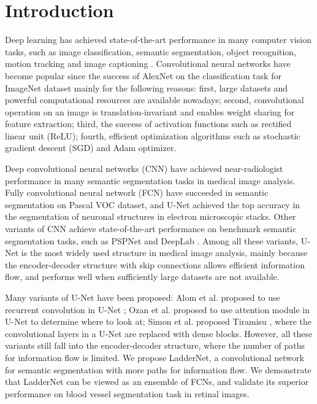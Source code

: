 \documentclass{article}
\begin{document}
\section{Introduction}
\label{sec:intro}
Deep learning has achieved state-of-the-art performance in many computer vision tasks, such as image classification, semantic segmentation, object recognition, motion tracking and image captioning \cite{lecun2015deep}. Convolutional neural networks have become popular since the success of AlexNet \cite{krizhevsky2012imagenet} on the classification task for ImageNet dataset \cite{deng2009imagenet} mainly for the following reasons: first, large datasets and powerful computational resources are available nowadays; second, convolutional operation on an image is translation-invariant and enables weight sharing for feature extraction; third, the success of activation functions such as rectified linear unit (ReLU); fourth, efficient optimization algorithms such as stochastic gradient descent (SGD) and Adam optimizer. 
\par
Deep convolutional neural networks (CNN) have achieved near-radiologist performance in many semantic segmentation tasks in medical image analysis. Fully convolutional neural network (FCN) \cite{long2015fully} have succeeded in semantic segmentation on Pascal VOC dataset, and U-Net \cite{ronneberger2015u} achieved the top accuracy in the segmentation of neuronal structures in electron microscopic stacks. Other variants of CNN achieve state-of-the-art performance on benchmark semantic segmentation tasks, such as PSPNet \cite{zhao2017pyramid} and DeepLab \cite{chen2018deeplab}. Among all these variants, U-Net is the most widely used structure in medical image analysis, mainly because the encoder-decoder structure with skip connections allows efficient information flow, and performs well when sufficiently large datasets are not available. 
\par
Many variants of U-Net have been proposed: Alom et al. proposed to use recurrent convolution in U-Net \cite{alom2018recurrent}; Ozan et al. proposed to use attention module in U-Net to determine where to look at; Simon et al. proposed Tiramisu \cite{jegou2017one}, where the convolutional layers in a U-Net are replaced with dense blocks. However, all these variants still fall into the encoder-decoder structure, where the number of paths for information flow is limited. We propose LadderNet, a convolutional network for semantic segmentation with more paths for information flow. We demonstrate that LadderNet can be viewed as an ensemble of FCNs, and validate its superior performance on blood vessel segmentation task in retinal images.  
\end{document}
